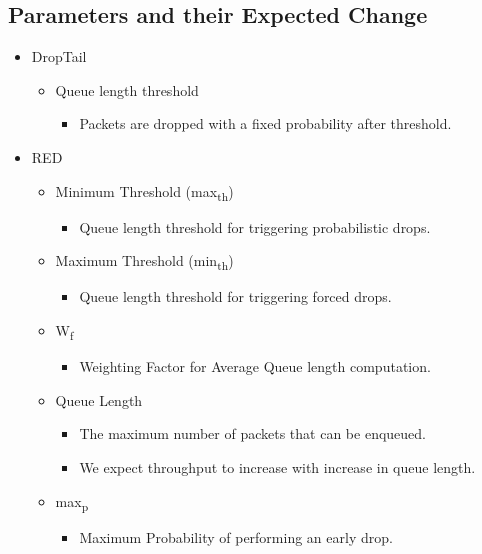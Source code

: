 \documentclass[paper=a4, fontsize=12pt]{scrartcl} %
\numberwithin{equation}{section} %
\numberwithin{figure}{section} %
\numberwithin{table}{section} %
\begin{document}
\subsection{Parameters and their Expected Change}
\begin{itemize}
	\item DropTail  
		\begin{itemize}
		\item Queue length threshold
			\begin{itemize}
			\item Packets are dropped with a fixed probability after threshold.\newline
			\end{itemize}
		\end{itemize}
	\item RED
		\begin{itemize}
		\item Minimum Threshold (max\textsubscript{th})
			\begin{itemize}
			\item Queue length threshold for triggering probabilistic drops.
			\end{itemize}
		\item Maximum Threshold (min\textsubscript{th})
			\begin{itemize}
			\item Queue length threshold for triggering forced drops. 
			\end{itemize}
		\item  W\textsubscript{f}
			\begin{itemize}
			\item Weighting Factor for Average Queue length computation.
			\end{itemize}
		\item Queue Length 
			\begin{itemize}
			\item The maximum number of packets that can be enqueued.
			\item We expect throughput to increase with increase in queue length.
			\end{itemize}
		\item max\textsubscript{p}
			\begin{itemize}
			\item Maximum Probability of performing an early drop.\newline
			\end{itemize}
		\end{itemize}
	

\end{itemize}
\end{document}
